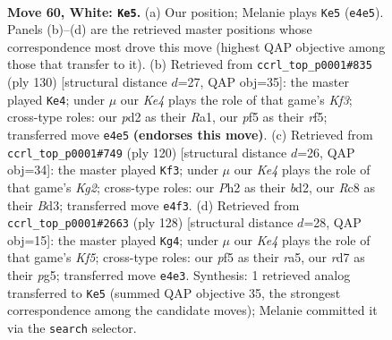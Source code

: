 \documentclass[11pt]{article}
\begin{document}
\clearpage

\begin{figure}[p]\centering
\begin{subfigure}{0.46\textwidth}\centering
\resizebox{\linewidth}{!}{%
\newchessgame
\chessboard[
  setfen={2R5/3r2k1/8/p4p1r/4K3/1P6/3p3P/R7 w - - 0 60},
  showmover=false,
  pgfstyle=straightmove, color=movearrow, markmove={e4-e5}
]}
\caption{}
\end{subfigure}\hfill
\begin{subfigure}{0.46\textwidth}\centering
\resizebox{\linewidth}{!}{%
\newchessgame
\chessboard[
  setfen={8/3r1k2/4R3/5rpP/2p5/2P2K2/8/R7 w - - 0 66},
  showmover=false,
  pgfstyle=straightmove, color=movearrow, markmove={f3-e4}
]}
\caption{}
\end{subfigure}
\\[4pt]
\begin{subfigure}{0.46\textwidth}\centering
\resizebox{\linewidth}{!}{%
\newchessgame
\chessboard[
  setfen={8/1p2k3/pP4P1/7R/3p2rp/3B4/3b2K1/8 w - - 1 61},
  showmover=false,
  pgfstyle=straightmove, color=movearrow, markmove={g2-f3}
]}
\caption{}
\end{subfigure}\hfill
\begin{subfigure}{0.46\textwidth}\centering
\resizebox{\linewidth}{!}{%
\newchessgame
\chessboard[
  setfen={6k1/8/7p/r4KpP/p2R4/P4P2/8/8 w - - 11 65},
  showmover=false,
  pgfstyle=straightmove, color=movearrow, markmove={f5-g4}
]}
\caption{}
\end{subfigure}
\caption{\textbf{Move 60, White: \texttt{Ke5}.} (a) Our position; Melanie plays \texttt{Ke5} (\texttt{e4e5}). Panels (b)--(d) are the retrieved master positions whose correspondence most drove this move (highest QAP objective among those that transfer to it). (b) Retrieved from \texttt{ccrl\_top\_p0001\#835} (ply 130) [structural distance $d$=27, QAP obj=35]: the master played \texttt{Ke4}; under $\mu$ our \emph{Ke4} plays the role of that game's \emph{Kf3}; cross-type roles: our \emph{p}d2 as their \emph{R}a1, our \emph{p}f5 as their \emph{r}f5; transferred move \texttt{e4e5} \textbf{(endorses this move)}. (c) Retrieved from \texttt{ccrl\_top\_p0001\#749} (ply 120) [structural distance $d$=26, QAP obj=34]: the master played \texttt{Kf3}; under $\mu$ our \emph{Ke4} plays the role of that game's \emph{Kg2}; cross-type roles: our \emph{P}h2 as their \emph{b}d2, our \emph{R}c8 as their \emph{B}d3; transferred move \texttt{e4f3}. (d) Retrieved from \texttt{ccrl\_top\_p0001\#2663} (ply 128) [structural distance $d$=28, QAP obj=15]: the master played \texttt{Kg4}; under $\mu$ our \emph{Ke4} plays the role of that game's \emph{Kf5}; cross-type roles: our \emph{p}f5 as their \emph{r}a5, our \emph{r}d7 as their \emph{p}g5; transferred move \texttt{e4e3}. Synthesis: 1 retrieved analog transferred to \texttt{Ke5} (summed QAP objective 35, the strongest correspondence among the candidate moves); Melanie committed it via the \texttt{search} selector.}
\label{fig:thought-m118}
\end{figure}
\end{document}
